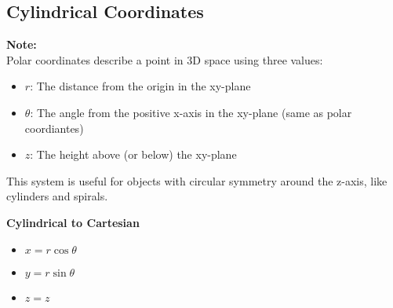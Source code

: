 \documentclass[10pt]{article}                               %
\begin{document}
\begin{defaultbox}
\begin{adjustwidth}{2em}{0pt}
\begin{adjustwidth}{2em}{0pt}
\begin{examplebox}
\begin{adjustwidth}{2em}{0pt}
                \end{adjustwidth}

            \end{examplebox}


        \end{adjustwidth}


        \subsection*{Cylindrical Coordinates}

        \begin{adjustwidth}{2em}{0pt}

            \begin{notebox}

                \textbf{Note:} \\
                Polar coordinates describe a point in 3D space using three values:

                \begin{itemize}
                    \item \( r \): The distance from the origin in the xy-plane
                    \item \( \theta \): The angle from the positive x-axis in the xy-plane (same as polar coordiantes)
                    \item \( z \): The height above (or below) the xy-plane
                \end{itemize}

                This system is useful for objects with circular symmetry around the z-axis, like cylinders and spirals.

            \end{notebox}

            \vspace{0.5em}

            \textbf{Cylindrical to Cartesian}

            \begin{itemize}
                \item \( x = r\cos\theta \)
                \item \( y = r\sin\theta \)
                \item \( z = z \)
            \end{itemize}

            \vspace{0.5em}


\end{adjustwidth}
\end{adjustwidth}
\end{defaultbox}
\end{document}
